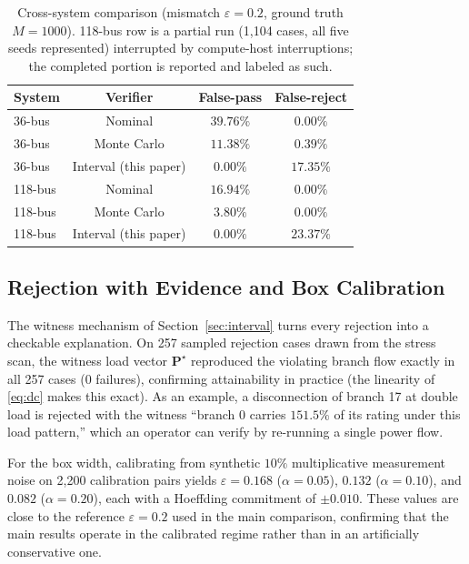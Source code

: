 \documentclass[journal]{IEEEtran}
\begin{document}
\begin{table}[t]
\centering
\caption{Cross-system comparison (mismatch $\varepsilon=0.2$, ground truth
$M=1000$). 118-bus row is a partial run (1{,}104 cases, all five seeds
represented) interrupted by compute-host interruptions; the completed portion
is reported and labeled as such.}
\label{tab:cross}
\begin{tabular}{lccc}
\toprule
System & Verifier & False-pass & False-reject \\
\midrule
36-bus & Nominal & $39.76\%$ & $0.00\%$ \\
36-bus & Monte Carlo & $11.38\%$ & $0.39\%$ \\
36-bus & Interval (this paper) & $\mathbf{0.00\%}$ & $17.35\%$ \\
118-bus & Nominal & $16.94\%$ & $0.00\%$ \\
118-bus & Monte Carlo & $3.80\%$ & $0.00\%$ \\
118-bus & Interval (this paper) & $\mathbf{0.00\%}$ & $23.37\%$ \\
\bottomrule
\end{tabular}
\end{table}

\subsection{Rejection with Evidence and Box Calibration}
\label{sec:reswitness}

The witness mechanism of Section~\ref{sec:interval} turns every rejection into
a checkable explanation. On 257 sampled rejection cases drawn from the stress
scan, the witness load vector $\mathbf{P}^\star$ reproduced the violating
branch flow exactly in all 257 cases (0 failures), confirming attainability in
practice (the linearity of \eqref{eq:dc} makes this exact). As an example, a
disconnection of branch 17 at double load is rejected with the witness
``branch 0 carries $151.5\%$ of its rating under this load pattern,'' which an
operator can verify by re-running a single power flow.

For the box width, calibrating from synthetic $10\%$ multiplicative
measurement noise on 2{,}200 calibration pairs yields
$\varepsilon = 0.168$ ($\alpha = 0.05$), $0.132$ ($\alpha = 0.10$), and
$0.082$ ($\alpha = 0.20$), each with a Hoeffding commitment of $\pm 0.010$.
These values are close to the reference $\varepsilon = 0.2$ used in the main
comparison, confirming that the main results operate in the calibrated regime
rather than in an artificially conservative one.
\end{document}
